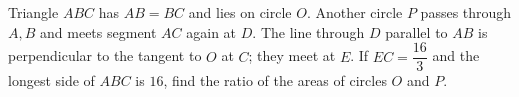 Triangle $ABC$ has $AB=BC$ and lies on circle $O$. Another circle $P$ passes through $A,B$ and meets segment $AC$ again at $D$. The line through $D$ parallel to $AB$ is perpendicular to the tangent to $O$ at $C$; they meet at $E$. If $EC=\dfrac{16}{3}$ and the longest side of $ABC$ is $16$, find the ratio of the areas of circles $O$ and $P$.
